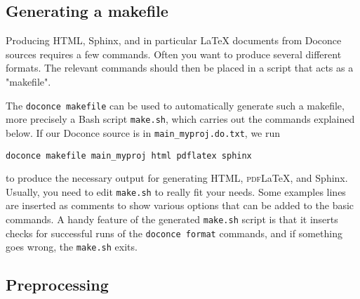 \documentclass[%
oneside,                 %
final,                   %
10pt]{article}
\begin{document}
\subsection{Generating a makefile}

Producing HTML, Sphinx, and in particular {\LaTeX} documents from
Doconce sources requires a few commands. Often you want to
produce several different formats. The relevant commands should
then be placed in a script that acts as a "makefile".

The {\fontsize{10pt}{10pt}\Verb!doconce makefile!} can be used to automatically generate
such a makefile, more precisely a Bash script {\fontsize{10pt}{10pt}\Verb!make.sh!}, which
carries out the commands explained below. If our Doconce source
is in {\fontsize{10pt}{10pt}\Verb!main_myproj.do.txt!}, we run

\vspace{4pt}
\begin{Verbatim}[numbers=none,frame=lines,fontsize=\fontsize{9pt}{9pt},labelposition=topline,framesep=2.5mm,framerule=0.7pt]
doconce makefile main_myproj html pdflatex sphinx
\end{Verbatim}
to produce the necessary output for generating HTML, \textsc{pdf}{\LaTeX}, and
Sphinx. Usually, you need to edit {\fontsize{10pt}{10pt}\Verb!make.sh!} to really fit your
needs. Some examples lines are inserted as comments to show
various options that can be added to the basic commands.
A handy feature of the generated {\fontsize{10pt}{10pt}\Verb!make.sh!} script is that it
inserts checks for successful runs of the {\fontsize{10pt}{10pt}\Verb!doconce format!} commands,
and if something goes wrong, the {\fontsize{10pt}{10pt}\Verb!make.sh!} exits.


\subsection{Preprocessing}
\end{document}
